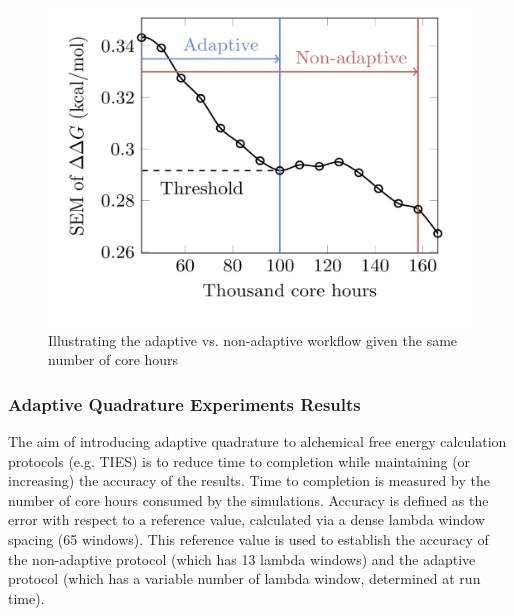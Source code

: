 

\begin{figure}
  \centering
    \includegraphics[width=\columnwidth]{figures/adaptive_vs_nonadaptive_pseudo.pdf}
    \caption{Illustrating the adaptive vs. non-adaptive workflow given the
    same number of core hours}
\label{fig:adaptive_vs_nonadaptive_TIES}
\end{figure}

\subsubsection{Adaptive Quadrature Experiments Results}

 

The aim of introducing adaptive quadrature to alchemical free energy 
calculation protocols (e.g. TIES) is to reduce time to completion while 
maintaining (or increasing) the accuracy of the results. Time to completion is 
measured by the number of core hours consumed by the simulations. Accuracy is 
defined as the error with respect to a reference value, calculated via a dense 
lambda window spacing (65 windows). This reference value is used to establish 
the accuracy of the non-adaptive protocol (which has 13 lambda windows) and the 
adaptive protocol (which has a variable number of lambda window, determined at 
run time).

